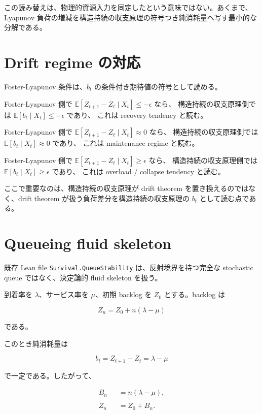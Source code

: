 \documentclass[12pt,a4paper]{article}
\begin{document}
この読み替えは、物理的資源入力を同定したという意味ではない。あくまで、Lyapunov 負荷の増減を構造持続の収支原理の符号つき純消耗量へ写す最小的な分解である。

\section{Drift regime の対応}\label{drift-regime-ux306eux5bfeux5fdc}

Foster-Lyapunov 条件は、\(b_{t}\) の条件付き期待値の符号として読める。

Foster-Lyapunov 側で \(\mathbb E[Z_{t+1}-Z_{t}\mid X_{t}]\le -\epsilon\) なら、 構造持続の収支原理側では \(\mathbb E[b_{t}\mid X_{t}]\le -\epsilon\) であり、 これは recovery tendency と読む。

Foster-Lyapunov 側で \(\mathbb E[Z_{t+1}-Z_{t}\mid X_{t}]\approx 0\) なら、 構造持続の収支原理側では \(\mathbb E[b_{t}\mid X_{t}]\approx 0\) であり、 これは maintenance regime と読む。

Foster-Lyapunov 側で \(\mathbb E[Z_{t+1}-Z_{t}\mid X_{t}]\ge \epsilon\) なら、 構造持続の収支原理側では \(\mathbb E[b_{t}\mid X_{t}]\ge \epsilon\) であり、 これは overload / collapse tendency と読む。

ここで重要なのは、構造持続の収支原理が drift theorem を置き換えるのではなく、drift theorem が扱う負荷差分を構造持続の収支原理の \(b_{t}\) として読む点である。

\section{Queueing fluid skeleton}\label{queueing-fluid-skeleton}

既存 Lean file \texttt{Survival.QueueStability} は、反射境界を持つ完全な stochastic queue ではなく、決定論的 fluid skeleton を扱う。

到着率を \(\lambda\)、サービス率を \(\mu\)、初期 backlog を \(Z_0\) とする。backlog は

\[
Z_{n}=Z_0+n(\lambda-\mu)
\]

である。

このとき純消耗量は

\[
b_{t}=Z_{t+1}-Z_{t}=\lambda-\mu
\]

で一定である。したがって、

\[
\begin{aligned}
B_{n}&=n(\lambda-\mu), \\
\qquad \\
Z_{n}&=Z_0+B_{n}.
\end{aligned}
\]
\end{document}
